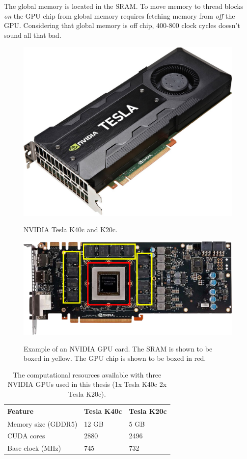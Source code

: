 The global memory is located in the SRAM.
To move memory to thread blocks \textit{on} the GPU chip from global memory requires fetching memory from \textit{off} the GPU.
Considering that global memory is off chip, 400-800 clock cycles doesn't sound all that bad.
\begin{figure}
	\centering\includegraphics[width=5in]{figures/gpu_intro/k40c_k20c.jpg}
	\label{fig:GPUpicture}
	\caption{NVIDIA Tesla K40c and K20c.}
\end{figure}
\begin{figure}
	\centering\includegraphics[width=\textwidth]{figures/gpu_intro/Kepler_box.png}
	\label{fig:GPUarch}
	\caption{Example of an NVIDIA GPU card. The SRAM is shown to be boxed in yellow. The GPU chip is shown to be boxed in red.}
\end{figure}
\begin{table}
\begin{center}
\begin{tabular}{lll}
	\toprule
	Feature 			& Tesla K40c 	& Tesla K20c 	\\ \midrule
	Memory size (GDDR5) & 12 GB 		& 5 GB 			\\
	CUDA cores 			& 2880 			& 2496 			\\
	Base clock (MHz) 	& 745 			& 732 			\\ \bottomrule
\end{tabular}
\end{center}
\label{tab:gpu-resources_jeffs}
\caption{The computational resources available with three NVIDIA GPUs used in this thesis (1x Tesla K40c 2x Tesla K20c).}
\end{table}

